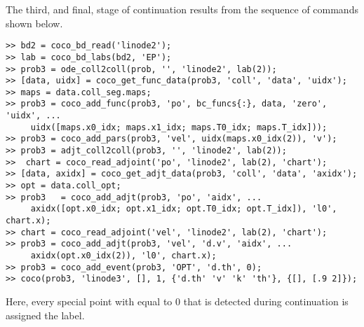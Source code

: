 The third, and final, stage of continuation results from the sequence of commands shown below.
\begin{lstlisting}[language=coco-highlight]
>> bd2 = coco_bd_read('linode2');
>> lab = coco_bd_labs(bd2, 'EP');
>> prob3 = ode_coll2coll(prob, '', 'linode2', lab(2));
>> [data, uidx] = coco_get_func_data(prob3, 'coll', 'data', 'uidx');
>> maps = data.coll_seg.maps;
>> prob3 = coco_add_func(prob3, 'po', bc_funcs{:}, data, 'zero', 'uidx', ...
     uidx([maps.x0_idx; maps.x1_idx; maps.T0_idx; maps.T_idx]));
>> prob3 = coco_add_pars(prob3, 'vel', uidx(maps.x0_idx(2)), 'v');
>> prob3 = adjt_coll2coll(prob3, '', 'linode2', lab(2));
>>  chart = coco_read_adjoint('po', 'linode2', lab(2), 'chart');
>> [data, axidx] = coco_get_adjt_data(prob3, 'coll', 'data', 'axidx');
>> opt = data.coll_opt;
>> prob3   = coco_add_adjt(prob3, 'po', 'aidx', ...
     axidx([opt.x0_idx; opt.x1_idx; opt.T0_idx; opt.T_idx]), 'l0', chart.x);
>> chart = coco_read_adjoint('vel', 'linode2', lab(2), 'chart');
>> prob3 = coco_add_adjt(prob3, 'vel', 'd.v', 'aidx', ...
     axidx(opt.x0_idx(2)), 'l0', chart.x);
>> prob3 = coco_add_event(prob3, 'OPT', 'd.th', 0);
>> coco(prob3, 'linode3', [], 1, {'d.th' 'v' 'k' 'th'}, {[], [.9 2]});
\end{lstlisting}
Here, every special point with  equal to $0$ that is detected during continuation is assigned the  label. \\
\medskip

